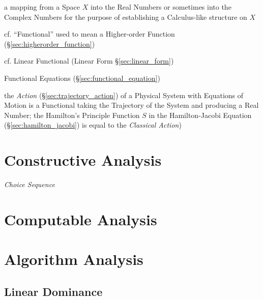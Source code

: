 a mapping from a Space $X$ into the Real Numbers or sometimes into the Complex
Numbers for the purpose of establishing a Calculus-like structure on $X$

\fist cf. ``Functional'' used to mean a Higher-order Function
(\S\ref{sec:higherorder_function})

\fist cf. Linear Functional (Linear Form \S\ref{sec:linear_form})

\fist Functional Equations (\S\ref{sec:functional_equation})

the \emph{Action} (\S\ref{sec:trajectory_action}) of a Physical System with
Equations of Motion is a Functional taking the Trajectory of the System and
producing a Real Number; the Hamilton's Principle Function $S$ in the
Hamilton-Jacobi Equation (\S\ref{sec:hamilton_jacobi}) is equal to the
\emph{Classical Action})



\section{Constructive Analysis}\label{sec:constructive_analysis}

\emph{Choice Sequence}

\section{Computable Analysis}\label{sec:computable_analysis}

\section{Algorithm Analysis}\label{sec:algorithm_analysis}

\subsection{Linear Dominance}\label{sec:linear_dominance}

